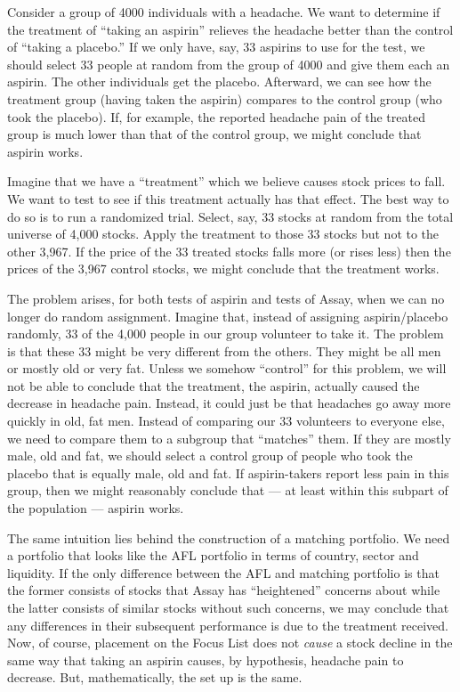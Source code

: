 \documentclass{article}
\begin{document}
Consider a group of 4000 individuals with a headache. We want to
determine if the treatment of ``taking an aspirin'' relieves the
headache better than the control of ``taking a placebo.'' If we only
have, say, 33 aspirins to use for the test, we should select 33 people
at random from the group of 4000 and give them each an aspirin. The
other individuals get the placebo. Afterward, we can see how the
treatment group (having taken the aspirin) compares to the control
group (who took the placebo). If, for example, the reported headache
pain of the treated group is much lower than that of the control
group, we might conclude that aspirin works.

Imagine that we have a ``treatment'' which we believe causes stock
prices to fall. We want to test to see if this treatment actually has
that effect. The best way to do so is to run a randomized trial.
Select, say, 33 stocks at random from the total universe of 4,000
stocks. Apply the treatment to those 33 stocks but not to the other
3,967. If the price of the 33 treated stocks falls more (or rises
less) then the prices of the 3,967 control stocks, we might conclude
that the treatment works.

The problem arises, for both tests of aspirin and tests of Assay, when
we can no longer do random assignment. Imagine that, instead of
assigning aspirin/placebo randomly, 33 of the 4,000 people in our
group volunteer to take it. The problem is that these 33 might be very
different from the others. They might be all men or mostly old or very
fat. Unless we somehow ``control'' for this problem, we will not be
able to conclude that the treatment, the aspirin, actually caused the
decrease in headache pain. Instead, it could just be that headaches go
away more quickly in old, fat men. Instead of comparing our 33
volunteers to everyone else, we need to compare them to a subgroup
that ``matches'' them. If they are mostly male, old and fat, we should
select a control group of people who took the placebo that is equally
male, old and fat. If aspirin-takers report less pain in this group,
then we might reasonably conclude that --- at least within this
subpart of the population --- aspirin works.

The same intuition lies behind the construction of a matching
portfolio. We need a portfolio that looks like the AFL portfolio in
terms of country, sector and liquidity. If the only difference between
the AFL and matching portfolio is that the former consists of stocks
that Assay has ``heightened'' concerns about while the latter consists
of similar stocks without such concerns, we may conclude that any
differences in their subsequent performance is due to the treatment
received. Now, of course, placement on the Focus List does not
\emph{cause} a stock decline in the same way that taking an aspirin
causes, by hypothesis, headache pain to decrease. But, mathematically,
the set up is the same.
\end{document}
